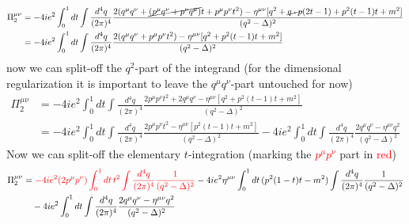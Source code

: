 \documentclass[10pt,a4paper]{article}
\theoremstyle{definition}
\begin{document}
\begin{enumerate}[1.]
\begin{enumerate}[1.)]
\begin{align}
\Pi_2^{\mu\nu}
&=-4ie^2\int_0^1 dt\int\frac{d^4q}{(2\pi)^4} \frac{2(q^\mu q^\nu+\cancel{(p^\mu q^\nu+p^\nu q^\mu)}t+p^\mu p^\nu t^2)-\eta^{\mu\nu}[q^2+\cancel{q\cdot p}(2t-1)+p^2(t-1)t+m^2]}{(q^2-\Delta)^2}\\
&=-4ie^2\int_0^1 dt\int\frac{d^4q}{(2\pi)^4} \frac{2(q^\mu q^\nu+p^\mu p^\nu t^2)-\eta^{\mu\nu}[q^2+p^2(t-1)t+m^2]}{(q^2-\Delta)^2}
\end{align}
now we can split-off the $q^2$-part of the integrand (for the dimensional regularization it is important to leave the $q^\mu q^\nu$-part untouched for now)
\begin{align}
\Pi_2^{\mu\nu}
&=-4ie^2\int_0^1 dt\int\frac{d^4q}{(2\pi)^4} \frac{2p^\mu p^\nu t^2+2q^\mu q^\nu-\eta^{\mu\nu}[q^2+p^2(t-1)t+m^2]}{(q^2-\Delta)^2}\\
&=-4ie^2\int_0^1 dt\int\frac{d^4q}{(2\pi)^4} \frac{2p^\mu p^\nu t^2-\eta^{\mu\nu}[p^2(t-1)t+m^2]}{(q^2-\Delta)^2}-4ie^2\int_0^1 dt\int\frac{d^4q}{(2\pi)^4}\frac{2q^\mu q^\nu-\eta^{\mu\nu}q^2}{(q^2-\Delta)^2}
\end{align}
Now we can split-off the elementary $t$-integration (marking the \textcolor{red}{$p^\mu p^\nu$} part in \textcolor{red}{red})
\begin{align}
\Pi_2^{\mu\nu}
&=\textcolor{red}{-4ie^2(2p^\mu p^\nu)\int_0^1 dt\, t^2\int\frac{d^4q}{(2\pi)^4} \frac{1}{(q^2-\Delta)^2}}
-4ie^2\eta^{\mu\nu}\int_0^1 dt\,(p^2(1-t)t-m^2)\int\frac{d^4q}{(2\pi)^4} \frac{1}{(q^2-\Delta)^2}\\
&\quad-4ie^2\int_0^1 dt\int\frac{d^4q}{(2\pi)^4}\frac{2q^\mu q^\nu-\eta^{\mu\nu}q^2}{(q^2-\Delta)^2}
\end{align}


\end{enumerate}
\end{enumerate}
\end{document}
